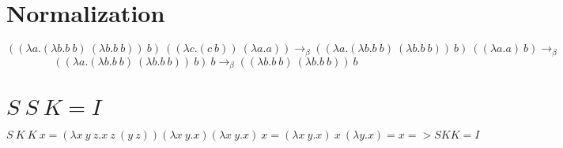 \documentclass{article}
\begin{document}
\section{Normalization}

\large$$((\lambda a.(\lambda  b.b\ b)\ (\lambda b.b\ b))\ b)\ ((\lambda c.(c\ b))\ (\lambda a.a)) \rightarrow_\beta
((\lambda a.(\lambda  b.b\ b)\ (\lambda b.b\ b))\ b)\ ((\lambda a.a)\ b) \rightarrow_\beta$$
$$((\lambda a.(\lambda  b.b\ b)\ (\lambda b.b\ b))\ b)\ b \rightarrow_\beta
((\lambda  b.b\ b)\ (\lambda b.b\ b))\ b$$

\section{$S\ S\ K = I$}
$$S\ K\ K\ x =  (\lambda x\ y\ z.x\ z\ (y\ z)) (\lambda x\ y.x) (\lambda x\ y.x)\ x = (\lambda x\ y.x)\ x\ (\lambda y.x) = x => S K K = I$$
\end{document}
